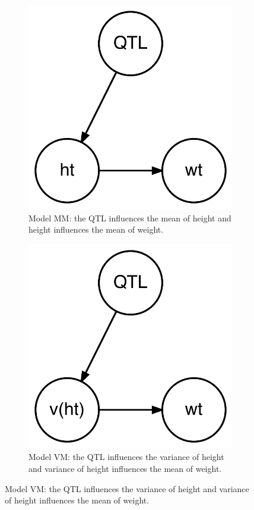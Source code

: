 \centering
\begin{figure}
	\centering
	\begin{subfigure}{0.45\textwidth}
		\includegraphics[width=0.8\linewidth]{images/graph_mm.pdf}
		\caption{Model MM: the QTL influences the mean of height and height influences the mean of weight.}
	\end{subfigure}\qquad
	\begin{subfigure}{0.45\textwidth}
		\includegraphics[width=0.8\linewidth]{images/graph_vm.pdf}
		\caption{Model VM: the QTL influences the variance of height and variance of height influences the mean of weight.}
	\end{subfigure}


\end{figure}
